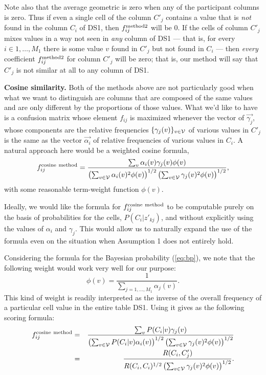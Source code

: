 \documentclass[12pt]{article}
\begin{document}
Note also that the average geometric is zero when any of the
participant columns is zero. Thus if even a single cell of the column
$C'_j$ contains a value that is {\em not} found in the column $C_i$ of
DS1, then $f_{ij}^{\rm method 2}$ will be 0. If the cells of column
$C'_j$ mixes values in a way not seen in {\em any} column of DS1 ---
that is, for every $i \in {1, \ldots, M_1}$ there is some value $v$
found in $C'_j$ but not found in $C_i$ --- then {\em every} coefficient 
$f_{ij}^{\rm method 2}$ for column $C'_j$ will be zero; that is, our method will say that $C'_j$ is not similar at all to any column of DS1.

{\bf Cosine similarity.}  Both of the methods above are not
particularly good when what we want to distinguish are columns that
are composed of the same values and are only different by the
proportions of those values. What we'd like to have is a confusion
matrix whose element $f_{ij}$ is maximized whenever the vector of
$\vec{\gamma_j}$, whose components are the relative frequencies
$\{\gamma_j(v)\}_{v\in \cal{V}}$ of various values in $C'_j$ is the
same as the vector $\vec{\alpha_i}$ of relative frequencies of various
values in $C_i$. A natural approach here would be a weighted cosine formula,
$$
f_{ij}^{\rm cosine \ method} = \frac{\sum_v{ \alpha_i(v) \gamma_j(v) \phi(v)}}{
\left(\sum_{v\in \cal{V}}{\alpha_i(v)^2  \phi(v)}\right)^{1/2}
\left(\sum_{v\in \cal{V}}{\gamma_j(v)^2  \phi(v)}\right)^{1/2}
},
$$
with some reasonable term-weight function $\phi(v)$.

Ideally, we would like the formula for $f_{ij}^{\rm cosine \ method}$
to be computable purely on the basis of probabilities for the cells,
$P(C_i|z'_{kj})$, and without explicitly using the values of
$\alpha_i$ and $\gamma_j$. This would allow us to naturally expand the
use of the formula even on the situation when Assumption 1 does not
entirely hold.

Considering the formula for the Bayesian probability (\ref{eq:bp}), we
note that the following weight would work very well for our purpose:
$$
\phi(v) = \frac{1}{\sum_{j=1,\ldots,M_1} \alpha_j(v)}.
$$ This kind of weight is readily interpreted as the inverse of the
overall frequency of a particular cell value in the entire table
DS1. Using it gives as the following scoring formula:
\begin{eqnarray}
\label{eq:ag-cos2}
f_{ij}^{\rm cosine \ method} &=& \frac{\sum_v{ P(C_i|v) \gamma_j(v)}}{
\left(\sum_{v\in \cal{V}}{P(C_i|v)\alpha_i(v)}\right)^{1/2}
\left(\sum_{v\in \cal{V}}{\gamma_j(v)^2  \phi(v)}\right)^{1/2}} \\
&=& \frac{ R(C_i,C'_j) }{ R(C_i,C_i)^{1/2} 
\left(\sum_{v\in \cal{V}}{\gamma_j(v)^2  \phi(v)}\right)^{1/2}}.
\end{eqnarray}
\end{document}
